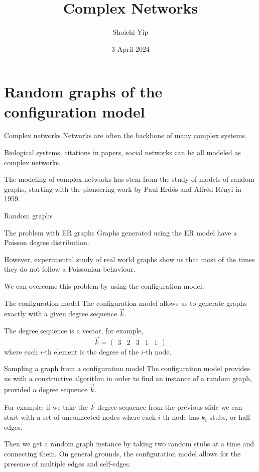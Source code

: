 \documentclass[handout]{beamer}
\title{Complex Networks}
\author{Shoichi Yip}
\institute{M2 PCS}
\date{3 April 2024}
\newcommand{\myvec}[1]{\ensuremath{\begin{pmatrix}#1\end{pmatrix}}}
\begin{document}
\frame{\titlepage}

\section{Random graphs of the configuration model}

\begin{frame}{Complex networks}
    \alert{Networks} are often the backbone of many complex systems.

    Biological systems, citations in papers, social networks can be all modeled
    as complex networks.

    The modeling of complex networks has stem from the study of
    \alert{models of random graphs}, starting with the pioneering work by Paul
    Erd\H{o}s and Alfr\'{e}d R\'{e}nyi in 1959.
\end{frame}

\begin{frame}{Random graphs}
\end{frame}

\begin{frame}{The problem with ER graphs}
    Graphs generated using the ER model have a Poisson degree distribution.

    However, experimental study of real world graphs show us that most of the
    times they do not follow a Poissonian behaviour.

    We can overcome this problem by using the \alert{configuration model}.
\end{frame}

\begin{frame}{The configuration model}
    The \alert{configuration model} allows us to generate graphs exactly with a
    given \alert{degree sequence} $\vec k$.

    The degree sequence is a vector, for example,
    $$
    \vec k = \myvec{3 & 2 & 3 & 1 & 1}
    $$
    where each $i$-th element is the degree of the $i$-th node.
\end{frame}

\begin{frame}{Sampling a graph from a configuration model}
    The configuration model provides us with a constructive algorithm in order
    to find an instance of a random graph, provided a degree sequence $\vec k$.

    For example, if we take the $\vec k$ degree sequence from the previous slide
    we can start with a set of unconnected nodes where each $i$-th node has
    $k_i$ \alert{stubs}, or half-edges.

    Then we get a random graph instance by taking two random stubs at a time and
    connecting them. On general grounds, the configuration model allows for the
    presence of multiple edges and self-edges.
\end{frame}
\end{document}

